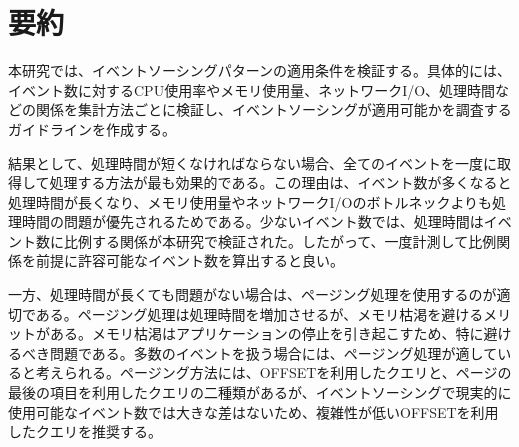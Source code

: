 \documentclass[../../main]{subfiles}
\begin{document}
    \section{要約}\label{sec:phraseology}

    本研究では、イベントソーシングパターンの適用条件を検証する。具体的には、イベント数に対するCPU使用率やメモリ使用量、ネットワークI/O、処理時間などの関係を集計方法ごとに検証し、イベントソーシングが適用可能かを調査するガイドラインを作成する。

    結果として、処理時間が短くなければならない場合、全てのイベントを一度に取得して処理する方法が最も効果的である。この理由は、イベント数が多くなると処理時間が長くなり、メモリ使用量やネットワークI/Oのボトルネックよりも処理時間の問題が優先されるためである。少ないイベント数では、処理時間はイベント数に比例する関係が本研究で検証された。したがって、一度計測して比例関係を前提に許容可能なイベント数を算出すると良い。

    一方、処理時間が長くても問題がない場合は、ページング処理を使用するのが適切である。ページング処理は処理時間を増加させるが、メモリ枯渇を避けるメリットがある。メモリ枯渇はアプリケーションの停止を引き起こすため、特に避けるべき問題である。多数のイベントを扱う場合には、ページング処理が適していると考えられる。ページング方法には、OFFSETを利用したクエリと、ページの最後の項目を利用したクエリの二種類があるが、イベントソーシングで現実的に使用可能なイベント数では大きな差はないため、複雑性が低いOFFSETを利用したクエリを推奨する。

    \clearpage
\end{document}
